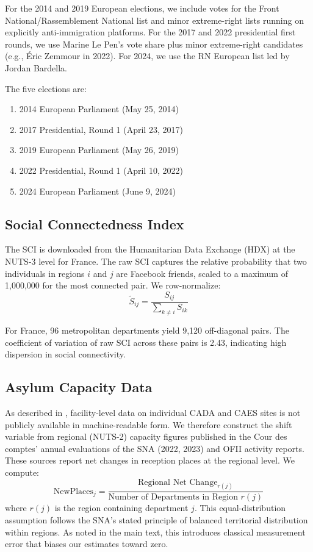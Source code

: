 \documentclass[12pt]{article}
\begin{document}
For the 2014 and 2019 European elections, we include votes for the Front National/Rassemb\-lement National list and minor extreme-right lists running on explicitly anti-immigration platforms. For the 2017 and 2022 presidential first rounds, we use Marine Le Pen's vote share plus minor extreme-right candidates (e.g., \'Eric Zemmour in 2022). For 2024, we use the RN European list led by Jordan Bardella.

The five elections are:
\begin{enumerate}
    \item 2014 European Parliament (May 25, 2014)
    \item 2017 Presidential, Round 1 (April 23, 2017)
    \item 2019 European Parliament (May 26, 2019)
    \item 2022 Presidential, Round 1 (April 10, 2022)
    \item 2024 European Parliament (June 9, 2024)
\end{enumerate}

\subsection{Social Connectedness Index}

The SCI is downloaded from the Humanitarian Data Exchange (HDX) at the NUTS-3 level for France. The raw SCI captures the relative probability that two individuals in regions $i$ and $j$ are Facebook friends, scaled to a maximum of 1,000,000 for the most connected pair. We row-normalize:
\[
\tilde{S}_{ij} = \frac{S_{ij}}{\sum_{k \neq i} S_{ik}}
\]

For France, 96 metropolitan departments yield 9,120 off-diagonal pairs. The coefficient of variation of raw SCI across these pairs is 2.43, indicating high dispersion in social connectivity.

\subsection{Asylum Capacity Data}

As described in , facility-level data on individual CADA and CAES sites is not publicly available in machine-readable form. We therefore construct the shift variable from regional (NUTS-2) capacity figures published in the Cour des comptes' annual evaluations of the SNA (2022, 2023) and OFII activity reports. These sources report net changes in reception places at the regional level. We compute:
\[
\text{NewPlaces}_j = \frac{\text{Regional Net Change}_{r(j)}}{\text{Number of Departments in Region } r(j)}
\]
where $r(j)$ is the region containing department $j$. This equal-distribution assumption follows the SNA's stated principle of balanced territorial distribution within regions. As noted in the main text, this introduces classical measurement error that biases our estimates toward zero.
\end{document}
